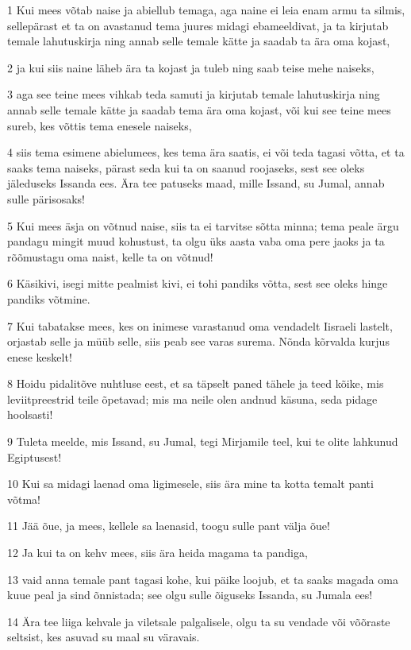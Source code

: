 \par 1 Kui mees võtab naise ja abiellub temaga, aga naine ei leia enam armu ta silmis, sellepärast et ta on avastanud tema juures midagi ebameeldivat, ja ta kirjutab temale lahutuskirja ning annab selle temale kätte ja saadab ta ära oma kojast,
\par 2 ja kui siis naine läheb ära ta kojast ja tuleb ning saab teise mehe naiseks,
\par 3 aga see teine mees vihkab teda samuti ja kirjutab temale lahutuskirja ning annab selle temale kätte ja saadab tema ära oma kojast, või kui see teine mees sureb, kes võttis tema enesele naiseks,
\par 4 siis tema esimene abielumees, kes tema ära saatis, ei või teda tagasi võtta, et ta saaks tema naiseks, pärast seda kui ta on saanud roojaseks, sest see oleks jäleduseks Issanda ees. Ära tee patuseks maad, mille Issand, su Jumal, annab sulle pärisosaks!
\par 5 Kui mees äsja on võtnud naise, siis ta ei tarvitse sõtta minna; tema peale ärgu pandagu mingit muud kohustust, ta olgu üks aasta vaba oma pere jaoks ja ta rõõmustagu oma naist, kelle ta on võtnud!
\par 6 Käsikivi, isegi mitte pealmist kivi, ei tohi pandiks võtta, sest see oleks hinge pandiks võtmine.
\par 7 Kui tabatakse mees, kes on inimese varastanud oma vendadelt Iisraeli lastelt, orjastab selle ja müüb selle, siis peab see varas surema. Nõnda kõrvalda kurjus enese keskelt!
\par 8 Hoidu pidalitõve nuhtluse eest, et sa täpselt paned tähele ja teed kõike, mis leviitpreestrid teile õpetavad; mis ma neile olen andnud käsuna, seda pidage hoolsasti!
\par 9 Tuleta meelde, mis Issand, su Jumal, tegi Mirjamile teel, kui te olite lahkunud Egiptusest!
\par 10 Kui sa midagi laenad oma ligimesele, siis ära mine ta kotta temalt panti võtma!
\par 11 Jää õue, ja mees, kellele sa laenasid, toogu sulle pant välja õue!
\par 12 Ja kui ta on kehv mees, siis ära heida magama ta pandiga,
\par 13 vaid anna temale pant tagasi kohe, kui päike loojub, et ta saaks magada oma kuue peal ja sind õnnistada; see olgu sulle õiguseks Issanda, su Jumala ees!
\par 14 Ära tee liiga kehvale ja viletsale palgalisele, olgu ta su vendade või võõraste seltsist, kes asuvad su maal su väravais.
